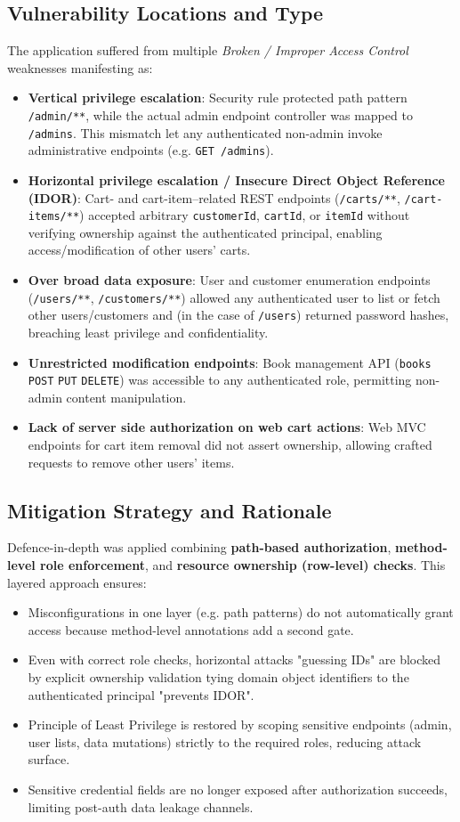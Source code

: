 \documentclass[]{UCD_CS_FYP_Report}
\begin{document}
\subsection{Vulnerability Locations and Type}
The application suffered from multiple \textit{Broken / Improper Access Control} weaknesses manifesting as:
\begin{itemize}
	\item \textbf{Vertical privilege escalation}: Security rule protected path pattern \texttt{/admin/**}, while the actual admin endpoint controller was mapped to \texttt{/admins}. This mismatch let any authenticated non-admin invoke administrative endpoints (e.g. \texttt{GET /admins}).
	\item \textbf{Horizontal privilege escalation / Insecure Direct Object Reference (IDOR)}: Cart- and cart-item–related REST endpoints (\texttt{/carts/**}, \texttt{/cart-items/**}) accepted arbitrary \texttt{customerId}, \texttt{cartId}, or \texttt{itemId} without verifying ownership against the authenticated principal, enabling access/modification of other users' carts.
	\item \textbf{Over broad data exposure}: User and customer enumeration endpoints (\texttt{/users/**}, \texttt{/customers/**}) allowed any authenticated user to list or fetch other users/customers and (in the case of \texttt{/users}) returned password hashes, breaching least privilege and confidentiality.
	\item \textbf{Unrestricted modification endpoints}: Book management API (\texttt{books} \texttt{POST} \texttt{PUT} \texttt{DELETE}) was accessible to any authenticated role, permitting non-admin content manipulation.
	\item \textbf{Lack of server side authorization on web cart actions}: Web MVC endpoints for cart item removal did not assert ownership, allowing crafted requests to remove other users' items.
\end{itemize}

\subsection{Mitigation Strategy and Rationale}
Defence-in-depth was applied combining \textbf{path-based authorization}, \textbf{method-level role enforcement}, and \textbf{resource ownership (row-level) checks}. This layered approach ensures:
\begin{itemize}
	\item Misconfigurations in one layer (e.g. path patterns) do not automatically grant access because method-level annotations add a second gate.
	\item Even with correct role checks, horizontal attacks "guessing IDs" are blocked by explicit ownership validation tying domain object identifiers to the authenticated principal "prevents IDOR".
	\item Principle of Least Privilege is restored by scoping sensitive endpoints (admin, user lists, data mutations) strictly to the required roles, reducing attack surface.
	\item Sensitive credential fields are no longer exposed after authorization succeeds, limiting post-auth data leakage channels.
\end{itemize}
\end{document}
